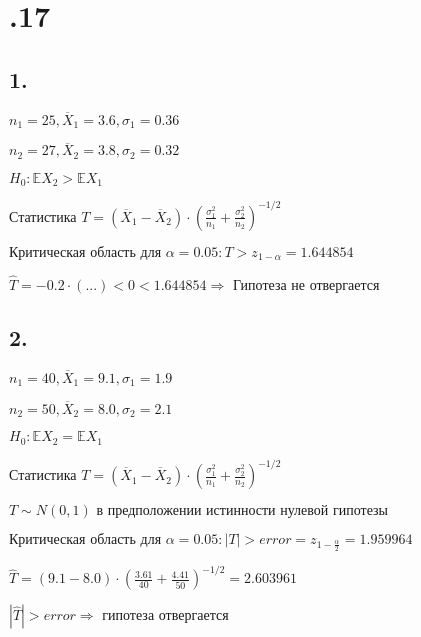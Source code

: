 \documentclass[13pt,a4paper]{scrartcl}
\def\a{\alpha}
\def\E{\exists\;}
\begin{document}
\def\s{\sigma}
\def\a{\alpha}
\def\X{\overline{X}}
\def\Y{\overline{Y}}
\def\E{\mathbb{E}}

\section*{\allowbreak {}\allowbreak {}\allowbreak {}.17}

\subsection*{ 1.}

\(n_1 = 25, \X_1 = 3.6, \s_1 = 0.36\)

\(n_2 = 27, \X_2 = 3.8, \s_2 = 0.32\)

\(H_0: \E X_2 > \E X_1\)

\(\text{Статистика }\allowbreak T = (\X_1 - \X_2)\cdot  (\frac{\s_1^2 }{n_1} + \frac{\s_2^2 }{n_2})^{-1/2}\)

\(\text{Критическая }\allowbreak \text{область }\allowbreak \text{для }\allowbreak \a = 0.05: T > z_{1 - \a} = 1.644854\)

\(\hat T = -0.2\cdot  (...) < 0 < 1.644854 \Rightarrow \text{ Гипотеза }\allowbreak \text{не }\allowbreak \text{отвергается}\allowbreak \)

\subsection*{ 2.}

\(n_1 = 40, \X_1 = 9.1, \s_1 = 1.9\)

\(n_2 = 50, \X_2 = 8.0, \s_2 = 2.1\)

\(H_0: \E X_2 = \E X_1\)

\(\text{Статистика }\allowbreak T = (\X_1 - \X_2)\cdot  (\frac{\s_1^2 }{n_1} + \frac{\s_2^2 }{n_2})^{-1/2}\)

\(T \sim  N(0, 1)\text{ в }\allowbreak \text{предположении }\allowbreak \text{истинности }\allowbreak \text{нулевой }\allowbreak \text{гипотезы}\allowbreak \)

\(\text{Критическая }\allowbreak \text{область }\allowbreak \text{для }\allowbreak \a = 0.05: |T| > error = z_{1 - \frac{\a }{2}} = 1.959964\)

\(\hat T = (9.1 - 8.0)\cdot  (\frac{3.61 }{40} + \frac{4.41 }{50})^{-1/2} = 2.603961\)

\(|\hat T| > error \Rightarrow \text{ гипотеза }\allowbreak \text{отвергается}\allowbreak \)
\end{document}
